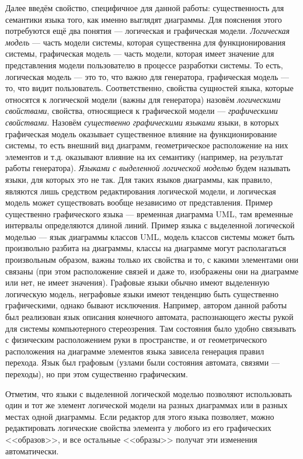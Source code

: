 Далее введём свойство, специфичное для данной работы: существенность для семантики 
языка того, как именно выглядят диаграммы. Для пояснения этого потребуются ещё два 
понятия --- логическая и графическая модели. 
\textit{Логическая модель} --- часть модели системы, которая существенна для 
функционирования системы, графическая модель --- часть модели, которая имеет 
значение для представления модели пользователю в процессе разработки системы. 
То есть, логическая модель --- это то, что важно для генератора, графическая 
модель --- то, что видит пользователь. Соответственно, свойства сущностей языка, 
которые относятся к логической модели (важны для генератора) назовём \textit{логическими 
свойствами}, свойства, относящиеся к графической модели --- \textit{графическими 
свойствами}. Назовём \textit{существенно графическими языками} языки, в которых 
графическая модель оказывает существенное влияние на функционирование системы, 
то есть внешний вид диаграмм, геометрическое расположение на них элементов 
и т.д. оказывают влияние на их семантику (например, на результат работы генератора). \textit{Языками с выделенной 
логической моделью} будем называть языки, для которых это не так. Для таких 
языков диаграммы, как правило, являются лишь средством редактирования логической 
модели, и логическая модель может существовать вообще независимо от 
представления. Пример существенно графического языка --- временная диаграмма 
\ac{UML}, там временные интервалы определяются длиной линий. Пример языка с 
выделенной логической моделью --- язык диаграммы классов \ac{UML}, модель классов 
системы может быть произвольно разбита на диаграммы, классы на диаграмме могут 
располагаться произвольным образом, важны только их свойства и то, с какими 
элементами они связаны (при этом расположение связей и даже то, изображены 
они на диаграмме или нет, не имеет значения). Графовые языки обычно имеют 
выделенную логическую модель, неграфовые языки имеют тенденцию быть существенно 
графическими, однако бывают исключения. Например, автором данной работы был 
реализован язык описания конечного автомата, распознающего жесты рукой для 
системы компьютерного стереозрения. Там состояния было удобно связывать с 
физическим расположением руки в пространстве, и от геометрического расположения 
на диаграмме элементов языка зависела генерация правил перехода. Язык был 
графовым (узлами были состояния автомата, связями --- переходы), но при этом 
существенно графическим.

Отметим, что языки с выделенной логической моделью позволяют 
использовать один и тот же элемент логической модели на разных диаграммах или 
в разных местах одной диаграммы. Если редактор для этого языка позволяет, можно 
редактировать логические свойства элемента у любого из его графических 
<<образов>>, и все остальные <<образы>> получат эти изменения автоматически. 


